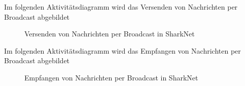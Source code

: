 \documentclass[german, 12pt]{book}
\begin{document}
\newpage

Im folgenden Aktivitätsdiagramm wird das Versenden von Nachrichten per Broadcast abgebildet
\begin{figure}[H]
	\centering
	\hspace*{1cm}
	\caption{Versenden von Nachrichten per Broadcast in SharkNet}
	\label{fig:broadcastSend}
\end{figure}

\newpage

Im folgenden Aktivitätsdiagramm wird das Empfangen von Nachrichten per Broadcast abgebildet
\begin{figure}[H]
	\centering
	\hspace*{1cm}
	\caption{Empfangen von Nachrichten per Broadcast in SharkNet}
	\label{fig:broadcastReceive}
\end{figure}
\end{document}
